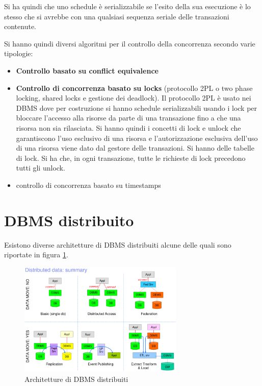 Si ha quindi che uno schedule è serializzabile se l'esito della sua esecuzione è
lo stesso che si avrebbe con una qualsiasi sequenza seriale delle transazioni
contenute.

Si hanno quindi diversi algoritmi per il controllo della concorrenza secondo
varie tipologie:
\begin{itemize}
    \item \textbf{Controllo basato su conflict equivalence}
    \item \textbf{Controllo di concorrenza basato su locks} (protocollo 2PL o two
          phase locking, shared locks e gestione dei deadlock). Il protocollo
          2PL è usato nei DBMS dove per costruzione si hanno schedule
          serializzabili usando i lock per bloccare l'accesso alla risorse da
          parte di una transazione fino a che una risorsa non sia rilasciata.
          Si hanno quindi i concetti di lock e unlock che garantiscono l'uso
          esclusivo di una risorsa e l'autorizzazione esclusiva dell'uso di una
          risorsa viene dato dal gestore delle transazioni. Si hanno delle
          tabelle di lock. Si ha che, in ogni transazione, tutte le richieste
          di lock precedono tutti gli unlock.
    \item controllo di concorrenza basato su timestamps
\end{itemize}

\section{DBMS distribuito}
Esistono diverse architetture di DBMS distribuiti alcune delle quali sono
riportate in figura \ref{fig:DBMS_distributed_architecture}.
\begin{figure}
    \centering
    \includegraphics[width=0.7\textwidth]{./img/DBMS/DBMS_distributed_architecture.png}
    \caption{Architetture di DBMS distribuiti}
    \label{fig:DBMS_distributed_architecture}
\end{figure}
